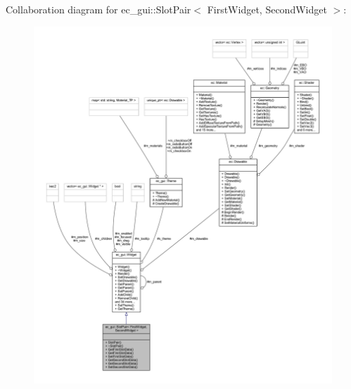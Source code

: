 Collaboration diagram for ec\+\_\+gui\+:\+:Slot\+Pair$<$ First\+Widget, Second\+Widget $>$\+:\nopagebreak
\begin{figure}[H]
\begin{center}
\leavevmode
\includegraphics[width=350pt]{classec__gui_1_1_slot_pair__coll__graph}
\end{center}
\end{figure}
